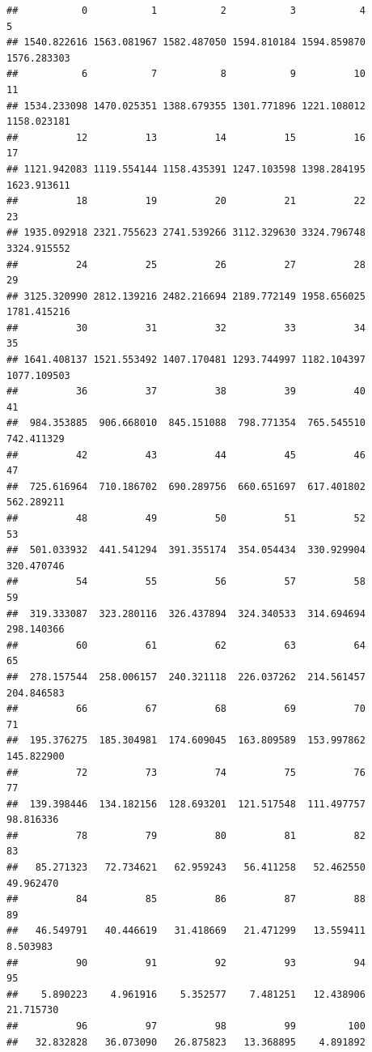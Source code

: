 \documentclass[
]{book}
\begin{document}
\begin{verbatim}
##           0           1           2           3           4           5 
## 1540.822616 1563.081967 1582.487050 1594.810184 1594.859870 1576.283303 
##           6           7           8           9          10          11 
## 1534.233098 1470.025351 1388.679355 1301.771896 1221.108012 1158.023181 
##          12          13          14          15          16          17 
## 1121.942083 1119.554144 1158.435391 1247.103598 1398.284195 1623.913611 
##          18          19          20          21          22          23 
## 1935.092918 2321.755623 2741.539266 3112.329630 3324.796748 3324.915552 
##          24          25          26          27          28          29 
## 3125.320990 2812.139216 2482.216694 2189.772149 1958.656025 1781.415216 
##          30          31          32          33          34          35 
## 1641.408137 1521.553492 1407.170481 1293.744997 1182.104397 1077.109503 
##          36          37          38          39          40          41 
##  984.353885  906.668010  845.151088  798.771354  765.545510  742.411329 
##          42          43          44          45          46          47 
##  725.616964  710.186702  690.289756  660.651697  617.401802  562.289211 
##          48          49          50          51          52          53 
##  501.033932  441.541294  391.355174  354.054434  330.929904  320.470746 
##          54          55          56          57          58          59 
##  319.333087  323.280116  326.437894  324.340533  314.694694  298.140366 
##          60          61          62          63          64          65 
##  278.157544  258.006157  240.321118  226.037262  214.561457  204.846583 
##          66          67          68          69          70          71 
##  195.376275  185.304981  174.609045  163.809589  153.997862  145.822900 
##          72          73          74          75          76          77 
##  139.398446  134.182156  128.693201  121.517548  111.497757   98.816336 
##          78          79          80          81          82          83 
##   85.271323   72.734621   62.959243   56.411258   52.462550   49.962470 
##          84          85          86          87          88          89 
##   46.549791   40.446619   31.418669   21.471299   13.559411    8.503983 
##          90          91          92          93          94          95 
##    5.890223    4.961916    5.352577    7.481251   12.438906   21.715730 
##          96          97          98          99         100 
##   32.832828   36.073090   26.875823   13.368895    4.891892
\end{verbatim}
\end{document}
